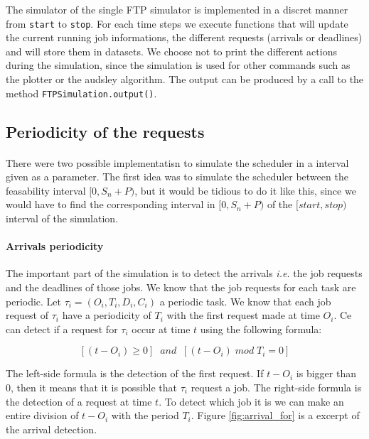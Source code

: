 \documentclass[letterpaper]{article}
\begin{document}
The simulator of the single FTP simulator is implemented in a discret manner
from \texttt{start} to \texttt{stop}. For each time steps
we execute functions that will update the
current running job informations, the different requests (arrivals or deadlines)
and will store them in datasets. We choose not to print the different
actions during the simulation,
since the simulation is used for other commands such as
the plotter or the audsley algorithm. The output can be produced by
a call to the method \texttt{FTPSimulation.output()}.

\subsection{Periodicity of the requests}

\paragraph{}

There were two possible implementatisn to simulate the scheduler in a
interval given as a parameter. The first idea was to simulate the scheduler
between the feasability interval $[0, S_n + P)$, but it would be tidious
to do it like this, since we would have to find the corresponding interval
in $[0, S_n + P)$ of the $[start, stop)$ interval of the simulation.

\paragraph{Arrivals periodicity}

The important part of the simulation is to detect the arrivals \textit{i.e.}
the job requests and the deadlines of those jobs. We know that
the job requests for each task are periodic.
Let $\tau_i = (O_i, T_i, D_i, C_i)$ a periodic task. We know that each
job request of $\tau_i$ have a periodicity of $T_i$ with the first request
made at time $O_i$. Ce can detect if a request for $\tau_i$ occur at time
$t$ using the following formula:

\begin{equation}
  \label{arr_period}
  [(t - O_i) \ge 0] \;\; and \;\; [(t - O_i) \; mod \; T_i = 0]
\end{equation}

The left-side formula is the detection of the first request. If $t - O_i$
is bigger than 0,
then it means that it is possible that $\tau_i$ request a job.
The right-side formula is the detection of a request at time $t$. To detect
which job it is we can make an entire division of $t - O_i$ with
the period $T_i$. Figure \ref{fig:arrival_for} is a excerpt of the arrival
detection.
\end{document}
